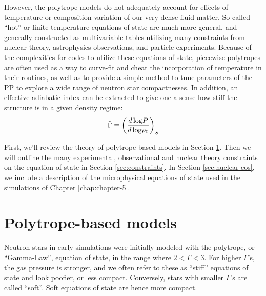 However, the polytrope models do not adequately account for effects of temperature or composition variation of our very dense fluid matter.  
So called ``hot'' or finite-temperature equations of state are much more general, and generally constructed as multivariable tables utilizing many constraints from nuclear theory, astrophysics observations, and particle experiments.
Because of the complexities for codes to utilize these equations of state, piecewise-polytropes are often used as a way to curve-fit and cheat the incorporation of temperature in their routines, as well as to provide a simple method to tune parameters of the PP to explore a wide range of neutron star compactnesses.
In addition, an effective adiabatic index can be extracted to give one a sense how stiff the structure is in a given density regime:
\begin{align}
\label{e:adiabat}
\tilde{\Gamma} \equiv \left( \frac{d\, {\rm log} P}{d\, {\rm log} \rho_0} \right) _S
\end{align}

First, we'll review the theory of polytrope based models in Section \ref{sec:polytropes}. Then we will outline the many experimental, observational and nuclear theory constraints on the equation of state in Section \ref{sec:constraints}.   In Section \ref{sec:nuclear-eos}, we include a description of the microphysical equations of state used in the simulations of Chapter \ref{chap:chapter-5}. 


\section{Polytrope-based models}
\label{sec:polytropes}

Neutron stars in early simulations were initially modeled with the polytrope, or ``Gamma-Law'', equation of state, in the range where $2 < \Gamma < 3$.
For higher $\Gamma$'s, the gas pressure is stronger, and we often refer to these as ``stiff'' equations of state and look poofier, or less compact.
Conversely, stars with smaller $\Gamma$'s are called ``soft''.  Soft equations of state are hence more compact.

